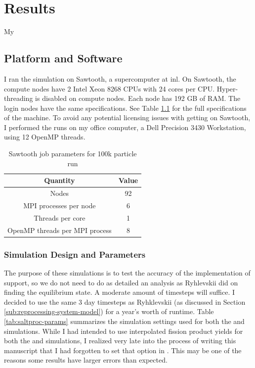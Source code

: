 \chapter{Results}
\label{ch:chapter5}

My  

\section{Platform and Software}
\label{sub:platform-software}
I ran the \OpenMC simulation on Sawtooth, a supercomputer at
\Gls{inl}. On Sawtooth, the compute nodes have 2 Intel Xeon 8268 CPUs with 24 cores per
CPU. Hyper-threading is disabled on compute nodes. Each node has 192 GB of RAM.
The login nodes have the same specifications. See Table \ref{tab:sawtooth-params}
for the full specifications of the machine. To avoid any potential licensing
issues with getting \SerpentTWO on Sawtooth, I performed the \SerpentTWO runs
on my office computer, a Dell Precision 3430 Workstation, using 12 OpenMP threads.

\begin{table}[htpb] 
    \centering 
    \caption{Sawtooth job parameters for 100k particle \OpenMC run}
    \label{tab:sawtooth-params}
    \begin{tabular}{|c|c|} 
        \hline
        Quantity & Value\\
        \hline
        Nodes & 92 \\
        \hline
        MPI processes per node & 6 \\
        \hline
        Threads per core & 1 \\
        \hline
        OpenMP threads per MPI process & 8 \\
        \hline
    \end{tabular}
\end{table}

\subsection{Simulation Design and Parameters}
\label{sub:simulation-parameters}

The purpose of these simulations is to test the accuracy of
the implementation of \OpenMC support, so we do not need to do as detailed an
analysis as Ryhlevskii did on finding the equilibrium state. A moderate amount
of timesteps will suffice. I decided to use the same 3 day timesteps as Ryhklevskii
\cite{rykhlevskii_modeling_2019} (as discussed in Section \ref{sub:reprocessing-system-model})
for a year's worth of runtime. Table \ref{tab:saltproc-params} summarizes the simulation
settings used for both the \SerpentTWO and \OpenMC simulations. While I had intended
to use interpolated fission product yields for both the \OpenMC and \SerpentTWO simulations,
I realized very late into the process of writing this manuscript that I had forgotten to set
that option in \OpenMC. This may be one of the reasons some results have larger errors than expected.
 
